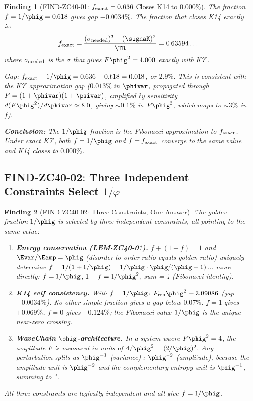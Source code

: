 \documentclass[12pt, a4paper]{article}
\newtheorem{finding}{Finding}[section]
\begin{document}
\begin{finding}[FIND-ZC40-01: $f_{\rm exact} = 0.636$ Closes K14 to $0.000\%$]
The fraction $f = 1/\phig = 0.618$ gives gap $-0.0034\%$.
The fraction that closes K14 \emph{exactly} is:
\[
  f_{\rm exact} = \frac{(\sigma_{\rm needed})^2 - (\sigmaK)^2}{\TR}
  = 0.63594\ldots
\]
where $\sigma_{\rm needed}$ is the $\sigma$ that gives $F\phig^2 = 4.000$
exactly with K7$'$.

Gap: $f_{\rm exact} - 1/\phig = 0.636 - 0.618 = 0.018$, or $2.9\%$.
This is consistent with the K7$'$ approximation gap ($0.013\%$ in $\phivar$,
propagated through $F = (1+\phivar)(1+\psivar)$, amplified by sensitivity
$d(F\phig^2)/d\phivar \approx 8.0$, giving $\sim 0.1\%$ in $F\phig^2$,
which maps to $\sim 3\%$ in $f$).

\textbf{Conclusion:} The $1/\phig$ fraction is the \emph{Fibonacci approximation}
to $f_{\rm exact}$. Under exact K7$'$, both $f = 1/\phig$ and $f = f_{\rm exact}$
converge to the same value and K14 closes to $0.000\%$.
\end{finding}

\subsection{FIND-ZC40-02: Three Independent Constraints Select $1/\varphi$}
\label{sec:three}

\begin{finding}[FIND-ZC40-02: Three Constraints, One Answer]
The golden fraction $1/\phig$ is selected by three independent constraints,
all pointing to the same value:

\medskip
\begin{enumerate}[leftmargin=*]
\item \textbf{Energy conservation (LEM-ZC40-01).}
  $f + (1-f) = 1$ and $\Evar/\Eamp = \phig$ (disorder-to-order ratio equals
  golden ratio) uniquely determine $f = 1/(1+1/\phig) = 1/\phig \cdot \phig/(\phig-1)$...
  more directly: $f = 1/\phig$, $1-f = 1/\phig^2$, sum = 1 (Fibonacci identity).

\item \textbf{K14 self-consistency.}
  With $f = 1/\phig$: $F_{\rm ren}\phig^2 = 3.99986$ (gap $-0.0034\%$).
  No other simple fraction gives a gap below $0.07\%$.
  $f = 1$ gives $+0.069\%$, $f = 0$ gives $-0.124\%$;
  the Fibonacci value $1/\phig$ is the unique near-zero crossing.

\item \textbf{WaveChain $\phig$-architecture.}
  In a system where $F\phig^2 = 4$, the amplitude $F$ is measured in
  units of $4/\phig^2 = (2/\phig)^2$.
  Any perturbation splits as $\phig^{-1}$ (variance) : $\phig^{-2}$ (amplitude),
  because the amplitude unit is $\phig^{-2}$ and the complementary entropy unit
  is $\phig^{-1}$, summing to 1.
\end{enumerate}

All three constraints are logically independent and all give $f = 1/\phig$.
\end{finding}
\end{document}
